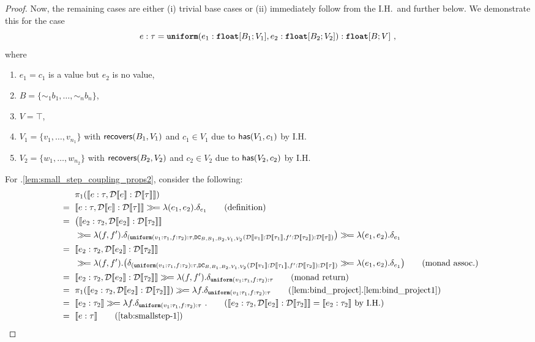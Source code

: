 \begin{proof}
	Now, the remaining cases are either (i) trivial base cases or (ii) immediately follow from the I.H.\ and  further below. We demonstrate this for the case 
	\[
	e:\tau = \textnormal{\ttfamily\bfseries uniform}(e_1 : \mathnormal{\textnormal{\ttfamily\bfseries float}}[B_1; V_1], e_2 : \mathnormal{\textnormal{\ttfamily\bfseries float}}[B_2; V_2]) : \mathnormal{\textnormal{\ttfamily\bfseries float}}[B; V]~,
	\]
	where
	\begin{enumerate}
		\item $e_1 = c_1$ is a value but $e_2$ is no value,
		\item $B =  \{\sim_1\!\!b_1, \ldots, \sim_n\!\!b_n\}$,
		\item $V=\top$, 
		\item $V_1 = \{v_1,\ldots, v_{n_1}\}$ with $\mathsf{recovers}(B_1, V_1)$ and $c_1 \in V_1$ due to $\mathsf{has}(V_1, c_1)$ by I.H. 
		\item $V_2 = \{w_1,\ldots, w_{n_2}\}$ with $\mathsf{recovers}(B_2, V_2)$ and  $c_2 \in V_2$ due to $\mathsf{has}(V_2, c_2)$ by I.H. 
	\end{enumerate}
	For .\ref{lem:small_step_coupling_props2}, consider the following:
	\begin{align*}
		& \pi_1(\sem{e:\tau, \discretize{e} : \discretize{\tau}}) \\
		~{}={}~ &  \sem{e:\tau, \discretize{e} : \discretize{\tau}} \gg\!= \lambda(e_1,e_2). \delta_{e_1}  
		\tag{definition} \\
		~{}={}~ & \big( \sem{e_2:\tau_2, \discretize{e_2} : \discretize{\tau_2}} \\
		& \gg\!= \lambda (f,f'). \delta_{(\uniform(v_1:\tau_1, f:\tau_2 ) : \tau, \dc(\discretize{v_1}:\discretize{\tau_1}, f': \discretize{\tau_2} ) : \discretize{\tau})} \big)
		 \gg\!= \lambda(e_1,e_2). \delta_{e_1}   \\
		 ~{}={}~ &  \sem{e_2:\tau_2, \discretize{e_2} : \discretize{\tau_2}} \\
		 & \gg\!= \lambda (f,f'). \big(\delta_{(\uniform(v_1:\tau_1, f:\tau_2 ) : \tau, \dc(\discretize{v_1}:\discretize{\tau_1}, f': \discretize{\tau_2} ) : \discretize{\tau})} 
		 \gg\!= \lambda(e_1,e_2). \delta_{e_1} \big)
		 \tag{monad assoc.} \\
		 ~{}={}~ &  \sem{e_2:\tau_2, \discretize{e_2} : \discretize{\tau_2}} 
		  \gg\!= \lambda (f,f'). \delta_{\uniform(v_1:\tau_1, f:\tau_2 ) : \tau} 
		 \tag{monad return} \\
		 ~{}={}~ &  \pi_1(\sem{e_2:\tau_2, \discretize{e_2} : \discretize{\tau_2}})
		 \gg\!= \lambda f. \delta_{\uniform(v_1:\tau_1, f:\tau_2 ) : \tau} 
		 \tag{\Cref{lem:bind_project}.\ref{lem:bind_project1}} \\
		 ~{}={}~ &  \sem{e_2:\tau_2}
		 \gg\!= \lambda f. \delta_{\uniform(v_1:\tau_1, f:\tau_2 ) : \tau} ~.
		 \tag{$ \sem{e_2:\tau_2, \discretize{e_2} : \discretize{\tau_2}}  =  \sem{e_2:\tau_2}$ by I.H.} \\
		 ~{}={}~ &  \sem{e : \tau}
		 \tag{\Cref{tab:smallstep-1}} 
	\end{align*}
\end{proof}

